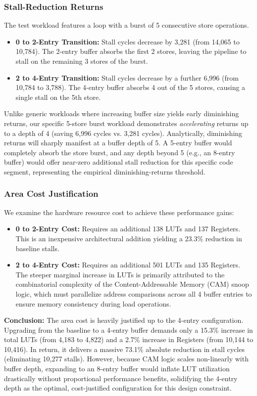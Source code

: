 \documentclass[conference]{IEEEtran}
\begin{document}
\subsubsection{Stall-Reduction Returns}
The test workload features a loop with a burst of 5 consecutive store operations.
\begin{itemize}
    \item \textbf{0 to 2-Entry Transition:} Stall cycles decrease by 3,281 (from 14,065 to 10,784). The 2-entry buffer absorbs the first 2 stores, leaving the pipeline to stall on the remaining 3 stores of the burst.
    \item \textbf{2 to 4-Entry Transition:} Stall cycles decrease by a further 6,996 (from 10,784 to 3,788). The 4-entry buffer absorbs 4 out of the 5 stores, causing a single stall on the 5th store.
\end{itemize}
Unlike generic workloads where increasing buffer size yields early diminishing returns, our specific 5-store burst workload demonstrates \textit{accelerating} returns up to a depth of 4 (saving 6,996 cycles vs. 3,281 cycles). Analytically, diminishing returns will sharply manifest at a buffer depth of 5. A 5-entry buffer would completely absorb the store burst, and any depth beyond 5 (e.g., an 8-entry buffer) would offer near-zero additional stall reduction for this specific code segment, representing the empirical diminishing-returns threshold.

\subsubsection{Area Cost Justification}
We examine the hardware resource cost to achieve these performance gains:
\begin{itemize}
    \item \textbf{0 to 2-Entry Cost:} Requires an additional 138 LUTs and 137 Registers. This is an inexpensive architectural addition yielding a 23.3\% reduction in baseline stalls.
    \item \textbf{2 to 4-Entry Cost:} Requires an additional 501 LUTs and 135 Registers. The steeper marginal increase in LUTs is primarily attributed to the combinatorial complexity of the Content-Addressable Memory (CAM) snoop logic, which must parallelize address comparisons across all 4 buffer entries to ensure memory consistency during load operations.
\end{itemize}
\textbf{Conclusion:} The area cost is heavily justified up to the 4-entry configuration. Upgrading from the baseline to a 4-entry buffer demands only a 15.3\% increase in total LUTs (from 4,183 to 4,822) and a 2.7\% increase in Registers (from 10,144 to 10,416). In return, it delivers a massive 73.1\% absolute reduction in stall cycles (eliminating 10,277 stalls). However, because CAM logic scales non-linearly with buffer depth, expanding to an 8-entry buffer would inflate LUT utilization drastically without proportional performance benefits, solidifying the 4-entry depth as the optimal, cost-justified configuration for this design constraint.
\end{document}
